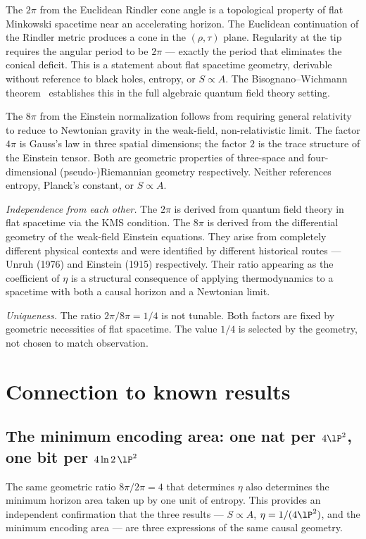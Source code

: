 The $2\pi$ from the Euclidean Rindler cone angle is a topological property of flat Minkowski spacetime near an accelerating horizon. The Euclidean
continuation of the Rindler metric produces a cone in the $(\rho,\tau)$ plane. Regularity at the tip requires the angular period to be $2\pi$ --- exactly the
period that eliminates the conical deficit. This is a statement about flat spacetime geometry, derivable without reference to black holes, entropy, or
$S\propto A$. The Bisognano--Wichmann theorem~\cite{BisognanoWichmann1976} establishes this in the full algebraic quantum field theory setting. \derived

The $8\pi$ from the Einstein normalization follows from requiring general relativity to reduce to Newtonian gravity in the weak-field, non-relativistic
limit. The factor $4\pi$ is Gauss's law in three spatial dimensions; the factor $2$ is the trace structure of the Einstein tensor. Both are geometric
properties of three-space and four-dimensional (pseudo-)Riemannian geometry respectively. Neither references entropy, Planck's constant, or $S\propto A$. \derived

\emph{Independence from each other.} The $2\pi$ is derived from quantum field theory in flat spacetime via the KMS condition. The $8\pi$ is derived from
the differential geometry of the weak-field Einstein equations. They arise from completely different physical contexts and were identified by different
historical routes --- Unruh (1976) and Einstein (1915) respectively. Their ratio appearing as the coefficient of $\eta$ is a structural consequence of
applying thermodynamics to a spacetime with both a causal horizon and a Newtonian limit. \interp

\emph{Uniqueness.} The ratio $2\pi/8\pi=1/4$ is not tunable. Both factors are fixed by geometric necessities of flat spacetime. The value $1/4$ is
selected by the geometry, not chosen to match observation. \interp

\section{Connection to known results}\label{sec:bk_known}
\subsection{The minimum encoding area: one nat per $4\lP^2$, one bit per $4\ln2\,\lP^2$}\label{sec:bk_minarea}
The same geometric ratio $8\pi/2\pi=4$ that determines $\eta$ also determines the minimum horizon area taken up by one unit of entropy. This provides an
independent confirmation that the three results --- $S\propto A$, $\eta=1/(4\lP^2)$, and the minimum encoding area --- are three expressions of the same
causal geometry. \interp

